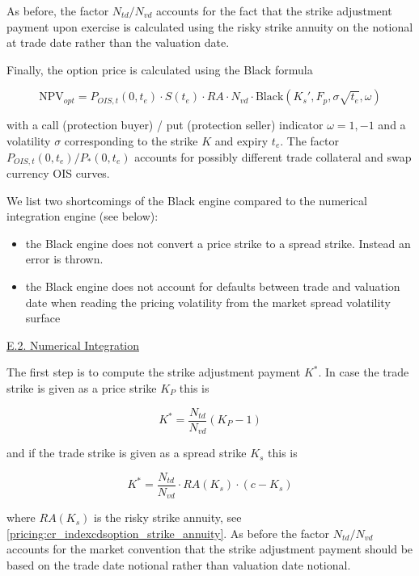 As before, the factor $N_{td} / N_{vd}$ accounts for the fact that the strike adjustment payment upon exercise is
calculated using the risky strike annuity on the notional at trade date rather than the valuation date.

Finally, the option price is calculated using the Black formula

\begin{equation}
  \text{NPV}_{opt} = P_{OIS,t}(0,t_e) \cdot S(t_e) \cdot  RA \cdot N_{vd} \cdot \text{Black} \left( K_s', F_p, \sigma\sqrt{t_e}, \omega \right)
\end{equation}

with a call (protection buyer) / put (protection seller) indicator $\omega = 1, -1$ and a volatility $\sigma$
corresponding to the strike $K$ and expiry $t_e$. The factor $P_{OIS,t}(0,t_e)/P_{*}(0,t_e)$ accounts for possibly
different trade collateral and swap currency OIS curves.

We list two shortcomings of the Black engine compared to the numerical integration engine (see below):

\begin{itemize}
\item the Black engine does not convert a price strike to a spread strike. Instead an error is thrown.
\item the Black engine does not account for defaults between trade and valuation date when reading the pricing
  volatility from the market spread volatility surface
\end{itemize}

\underline{E.2. Numerical Integration}

The first step is to compute the strike adjustment payment $K^*$. In case the trade strike is given as a price strike
$K_P$ this is

\begin{equation}
K^* = \frac{N_{td}}{N_{vd}}(K_P - 1)
\end{equation}

and if the trade strike is given as a spread strike $K_s$ this is

\begin{equation}
K^* = \frac{N_{td}}{N_{vd}} \cdot RA(K_s) \cdot ( c - K_s )
\end{equation}

where $RA(K_s)$ is the risky strike annuity, see \ref{pricing:cr_indexcdsoption_strike_annuity}. As before the factor
$N_{td} / N_{vd}$ accounts for the market convention that the strike adjustment payment should be based on the trade
date notional rather than valuation date notional.

